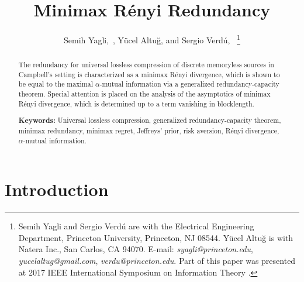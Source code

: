 \documentclass[journal, 10pt]{IEEEtran}
\theoremstyle{plain}
\theoremstyle{plain}
\theoremstyle{plain}
\theoremstyle{plain}
\begin{document}
\title{Minimax R\'enyi Redundancy}
\author{Semih Yagli,~, Y\"{u}cel Altu\u{g}, and Sergio Verd\'u,~
\thanks{Semih Yagli and Sergio Verd\'u are with the Electrical Engineering Department, Princeton University, Princeton, NJ 08544. Y\"ucel Altu\u{g} is with Natera Inc., San Carlos, CA 94070. E-mail: {\em syagli@princeton.edu}, {\em yucelaltug@gmail.com}, {\em verdu@princeton.edu}. Part of this paper was presented at 2017 IEEE International Symposium on Information Theory \cite{Yagli2017ISIT}.
}}
\maketitle

\begin{abstract}

 The redundancy for universal lossless compression of discrete memoryless sources in Campbell's setting is characterized as a minimax R\'enyi divergence, which is shown to be equal to the maximal $\alpha$-mutual information via a generalized redundancy-capacity theorem. Special attention is placed on the analysis of the asymptotics of minimax R\'enyi divergence, which is determined up to a term vanishing in blocklength. 


\textbf{Keywords:} Universal lossless compression, generalized redundancy-capacity theorem, minimax redundancy, minimax regret,   Jeffreys' prior, risk aversion, R\'enyi divergence, $\alpha$-mutual information.  

\end{abstract}

\section{Introduction} \label{sec:introduction}
\end{document}
